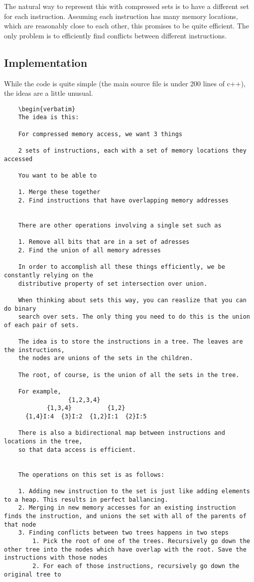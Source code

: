 \documentclass[12pt,twoside]{reedthesis}
\begin{document}
		The natural way to represent this with compressed sets is to have a different set for each instruction. Assuming each instruction has many memory locations, which are reasonably close to each other, this promises to be quite efficient. The only problem is to efficiently find conflicts between different instructions.

		\subsection{Implementation}

		While the code is quite simple (the main source file is under 200 lines of c++), the ideas are a little unusual.

		\begin{verbatim}
    \begin{verbatim}
    The idea is this:

    For compressed memory access, we want 3 things

    2 sets of instructions, each with a set of memory locations they accessed

    You want to be able to

    1. Merge these together
    2. Find instructions that have overlapping memory addresses


    There are other operations involving a single set such as

    1. Remove all bits that are in a set of adresses
    2. Find the union of all memory adresses

    In order to accomplish all these things efficiently, we be constantly relying on the
    distributive property of set intersection over union.

    When thinking about sets this way, you can reaslize that you can do binary
    search over sets. The only thing you need to do this is the union of each pair of sets.

    The idea is to store the instructions in a tree. The leaves are the instructions,
    the nodes are unions of the sets in the children.

    The root, of course, is the union of all the sets in the tree.

    For example,
                  {1,2,3,4}
            {1,3,4}          {1,2}
      {1,4}I:4  {3}I:2  {1,2}I:1  {2}I:5

    There is also a bidirectional map between instructions and locations in the tree,
    so that data access is efficient.


    The operations on this set is as follows:

    1. Adding new instruction to the set is just like adding elements to a heap. This results in perfect ballancing.
    2. Merging in new memory accesses for an existing instruction finds the instruction, and unions the set with all of the parents of that node
    3. Finding conflicts between two trees happens in two steps
        1. Pick the root of one of the trees. Recursively go down the other tree into the nodes which have overlap with the root. Save the instructions with those nodes
        2. For each of those instructions, recursively go down the original tree to
    \end{verbatim}
	
\end{document}
